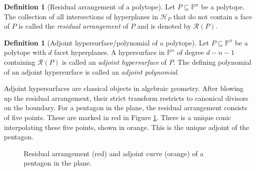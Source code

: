 \documentclass[12pt]{extarticle}
\theoremstyle{definition}
\newtheorem{definition}[theorem]{Definition}
\newenvironment{example}
{\pushQED{\qed}\renewcommand{\qedsymbol}{$\diamond$}\examplex}
{\popQED\endexamplex}
\begin{document}
\begin{definition}[Residual arrangement of a polytope] \label{def:ra_pol}
    Let $P\subseteq \mathbb{P}^n$ be a polytope. The collection of all intersections of hyperplanes in $\mathcal{H}_P$ that do not contain a face of $P$ is called the \emph{residual arrangement} of $P$ and is denoted by $\mathcal{R}(P)$. 
\end{definition}

\begin{definition}[Adjoint hypersurface/polynomial of a polytope]
Let $P\subseteq \mathbb{P}^n$ be a polytope with $d$ facet hyperplanes. A hypersurface in $\mathbb{P}^n$ of degree $d-n-1$ containing $\mathcal{R}(P)$ is called an \emph{adjoint hypersurface} of $P$. The defining polynomial of an adjoint hypersurface is called an \emph{adjoint polynomial}.
\end{definition}
Adjoint hypersurfaces are classical objects in algebraic geometry. After blowing up the residual arrangement, their strict transform restricts to canonical divisors on the boundary.
\begin{example} \label{ex:intro}
    For a pentagon in the plane, the residual arrangement consists of five points. These are marked in red in Figure \ref{fig:pentagon}. There is a unique conic interpolating these five points, shown in orange. This is the unique adjoint of the pentagon. 
\end{example}

\begin{figure}
            \centering
            \caption{Residual arrangement (red) and adjoint curve (orange) of a pentagon in the plane.}
            \label{fig:pentagon}
\end{figure}
\end{document}
